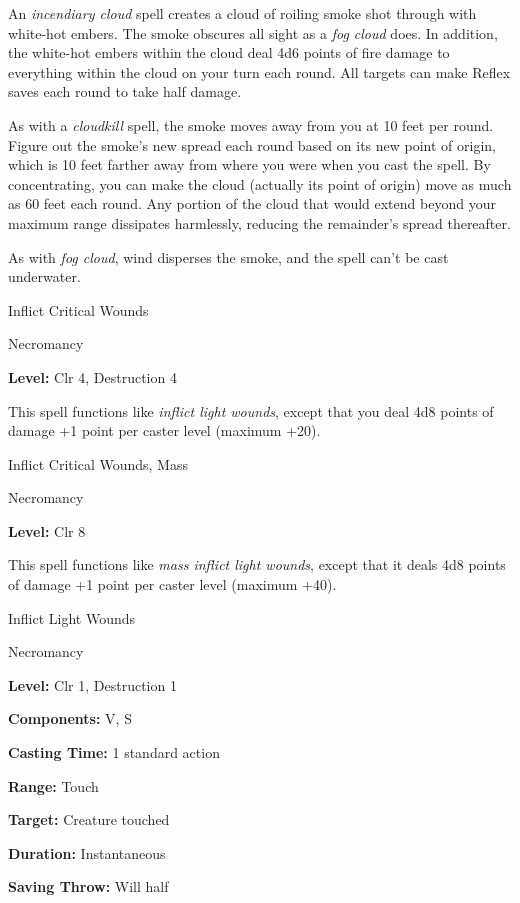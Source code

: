 \documentclass{article}
\begin{document}
An \textit{incendiary cloud }spell creates a cloud of roiling smoke shot through 
with white-hot embers. The smoke obscures all sight as a \textit{fog cloud }does. 
In addition, the white-hot embers within the cloud deal 4d6 points of fire damage 
to everything within the cloud on your turn each round. All targets can make Reflex 
saves each round to take half damage.

As with a \textit{cloudkill }spell, the smoke moves away from you at 10 feet per 
round. Figure out the smoke's new spread each round based on its new point of origin, 
which is 10 feet farther away from where you were when you cast the spell. By concentrating, 
you can make the cloud (actually its point of origin) move as much as 60 feet each 
round. Any portion of the cloud that would extend beyond your maximum range dissipates 
harmlessly, reducing the remainder's spread thereafter.

As with \textit{fog cloud}, wind disperses the smoke, and the spell can't be cast 
underwater.

\vspace{12pt}
Inflict Critical Wounds

Necromancy

\textbf{Level:} Clr 4, Destruction 4

This spell functions like \textit{inflict light wounds}, except that you deal 4d8 
points of damage +1 point per caster level (maximum +20).

\vspace{12pt}
Inflict Critical Wounds, Mass

Necromancy

\textbf{Level:} Clr 8

This spell functions like \textit{mass inflict light wounds}, except that it deals 
4d8 points of damage +1 point per caster level (maximum +40).

\vspace{12pt}
Inflict Light Wounds

Necromancy

\textbf{Level:} Clr 1, Destruction 1

\textbf{Components:} V, S

\textbf{Casting Time:} 1 standard action

\textbf{Range:} Touch

\textbf{Target:} Creature touched

\textbf{Duration:} Instantaneous

\textbf{Saving Throw: }Will half
\end{document}
